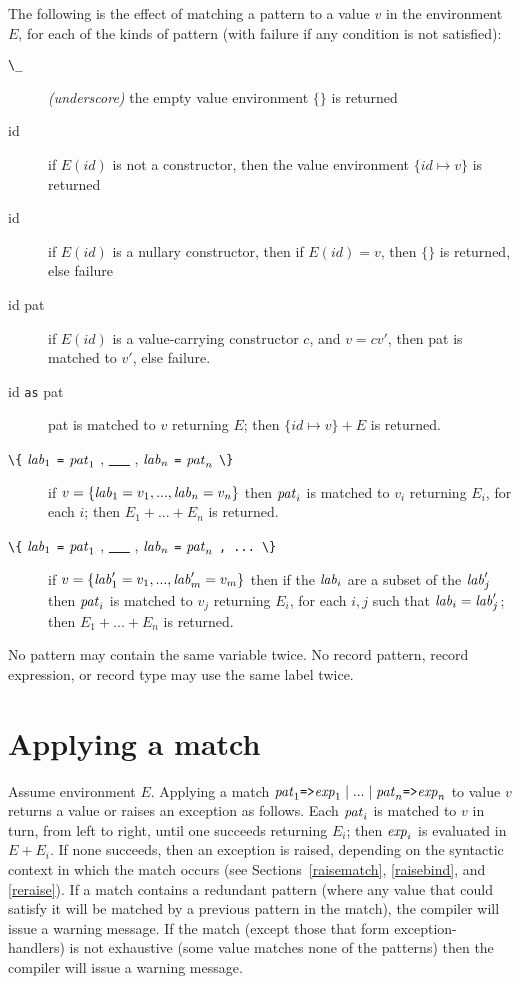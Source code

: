 The following is the effect of matching a pattern  to a value $v$ in the
environment $E$, for
each of the kinds of pattern (with failure if any condition is not
satisfied):
\begin{description}
\item[\protect\verb"\_"\hfill]  {\it (underscore)} the empty value environment $\{\}$ is
returned
\item[id\hfill] if $E(id)$ is not a constructor, then the value environment
$\{id \mapsto v\}$ is returned
\item[id\hfill] if $E(id)$ is a nullary constructor, then if $E(id)=v$,
then $\{\}$ is returned, else failure
\item[id pat\hfill]  if $E(id)$ is a value-carrying constructor $c$, and 
$v = c v'$, then pat is matched to $v'$, else failure.
\item[id \protect\verb"as" pat\hfill]  pat is matched to $v$ returning $E$;
then $\{id \mapsto v\}+E$ is returned.
\item[\protect\verb"\{" ${\it lab}_1$ \protect\verb"=" ${\it pat}_1$ , \underline{\ \ \ } , ${\it lab}_n$ \protect\verb"=" ${\it pat}_n$ \protect\verb"\}" \hfill]  
if $v = \{ {\it lab}_1 = v_1 , ... , {\it lab}_n = v_n \}$ then 
${\it pat}_i$ is matched to $v_i$ returning $E_i$, for each $i$; then 
$E_1 + ... + E_n$ is returned.

\item[\protect\verb"\{" ${\it lab}_1$ \protect\verb"=" ${\it pat}_1$ , \underline{\ \ \ } , ${\it lab}_n$ \protect\verb"=" ${\it pat}_n$ \protect\verb", ... \}" \hfill]  
if $v = \{ {\it lab}'_1 = v_1 , ... , {\it lab}'_m = v_m \}$ then if
the ${\it lab}_i$ are a subset of the ${\it lab}'_j$ then
${\it pat}_i$ is matched to $v_j$ returning $E_i$, for each $i,j$ such that
${\it lab}_i = {\it lab}'_j$; then 
$E_1 + ... + E_n$ is returned.
\end{description}
No pattern may contain the same variable twice.
No record pattern, record expression, or record type may use the same
label twice.
\section{Applying a match}
Assume environment $E$.  Applying a match
$ {\it pat}_1 \protect\verb"=>" {\it exp}_1 \mid ... 
\mid {\it pat}_n \protect\verb"=>" {\it exp}_n $ to value $v$ returns a value
or raises an exception as follows.  Each ${\it pat}_i$ is matched to
$v$ in turn, from left to right, until one succeeds returning $E_i$;
then ${\it exp}_i$ is evaluated in $E+E_i$.  If none succeeds, then
an exception is raised, depending on the syntactic context in which
the match occurs (see Sections~\ref{raisematch}, \ref{raisebind}, and \ref{reraise}).
\label{matchwarn}
If a match contains a redundant pattern (where any value that could
satisfy it will be matched by a previous pattern in the match), the
compiler will issue a warning message.  If the match (except those
that form exception-handlers) is not exhaustive (some value matches
none of the patterns) then the compiler will issue a warning message.

